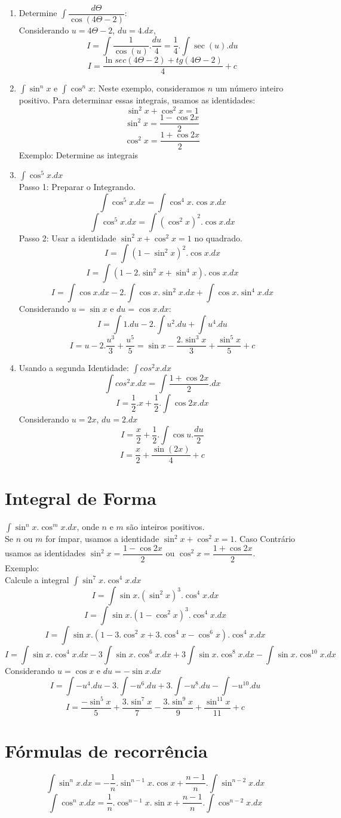 \documentclass{article}
\begin{document}
\begin{enumerate}
				\item Determine $\int \dfrac{d\Theta}{\cos{(4\Theta -2)}}$:\\
					Considerando $u = 4\Theta -2$, $du = 4.dx$,
					$$I = \int \dfrac{1}{\cos(u)}.\dfrac{du}{4}=\dfrac{1}{4}.\int \sec(u).du$$
					$$I=\dfrac{\ln sec(4\Theta-2)+tg(4\Theta -2)}{4}+c$$
				\item $\int \sin^nx$ e $\int \cos^nx$:
					Neste exemplo, consideramos $n$ um número inteiro positivo. Para determinar essas integrais, usamos as identidades:
					$$\sin^2x+\cos^2x=1$$
					$$\sin^2x=\dfrac{1-\cos{2x}}{2}$$
					$$\cos^2x = \dfrac{1+\cos{2x}}{2}$$
					Exemplo: Determine as integrais
				\item $\int \cos^5x.dx$\\
					Passo 1: Preparar o Integrando.
					$$\int \cos^5x.dx=\int \cos^4x.\cos x.dx$$
					$$\int \cos^5x.dx= \int (\cos^2x)^2.\cos x.dx$$
					Passo 2: Usar a identidade $\sin^2x+\cos^2x=1$ no quadrado.
					$$I=\int(1-\sin^2x)^2.\cos{x}.dx$$
					$$I = \int (1-2.\sin^2x+\sin^4x).\cos{x}.dx$$
					$$I=\int \cos{x}.dx - 2.\int {\cos{x}.\sin^2x.dx+\int \cos{x}.\sin^4x}.dx$$
					Considerando $u = \sin{x}$ e $du = \cos{x}.dx$:
					$$I = \int 1.du - 2.\int u^2.du +\int u^4.du$$
					$$I = u-2.\dfrac{u^3}{3}+\dfrac{u^5}{5}=\sin{x}-\dfrac{2.\sin^3x}{3}+\dfrac{\sin^5x}{5}+c$$
				\item Usando a segunda Identidade: $\int cos^2x.dx$\\
					$$\int cos^2x.dx = \int \dfrac{1+\cos{2x}}{2}.dx$$
					$$I = \dfrac{1}{2}.x +\dfrac{1}{2}.\int \cos{2x}.dx$$
					Considerando $u = 2x$, $du = 2.dx$
					$$I = \dfrac{x}{2}+\dfrac{1}{2}.\int \cos{u}.\dfrac{du}{2}$$
					$$I = \dfrac{x}{2}+\dfrac{\sin(2x)}{4}+c$$
				\end{enumerate}
	\section{Integral de Forma}
		$\int \sin^nx.\cos^mx.dx$, onde $n$ e $m$ são inteiros positivos.\\
		Se $n$ ou $m$ for ímpar, usamos a identidade $\sin^2x+\cos^2x=1$. Caso Contrário usamos as identidades $\sin^2x=\dfrac{1-\cos{2x}}{2}$ ou $\cos^2x = \dfrac{1+\cos{2x}}{2}$.\\
		Exemplo:\\
		Calcule a integral $\int \sin^7x.\cos^4x.dx$
		$$I = \int \sin{x}.(\sin^2x)^3.\cos^4x.dx$$
		$$I = \int \sin{x}.(1-\cos^2x)^3.\cos^4x.dx$$
		$$I = \int \sin{x}.(1-3.\cos^2x+3.\cos^4x-\cos^6x).\cos^4x.dx$$
		$$I= \int \sin{x}.\cos^4x.dx-3\int \sin{x}.\cos^6x.dx+3\int \sin{x}.\cos^8x.dx-\int \sin{x}.\cos^{10}x.dx$$
		Considerando $u = \cos{x}$ e $du = -\sin{x}.dx$
		$$I = \int -u^4.du -3.\int-u^6.du +3.\int -u^8.du -\int -u^{10}.du$$
		$$I=\dfrac{-\sin^5{x}}{5}+\dfrac{3.\sin^7x}{7}-\dfrac{3.\sin^9x}{9}+\dfrac{\sin^{11}x}{11}+c$$
	\section{Fórmulas de recorrência}
		$$\int \sin^nx.dx =-\dfrac{1}{n}.\sin^{n-1}x.\cos{x}+\dfrac{n-1}{n}.\int \sin^{n-2}x.dx$$
		$$\int \cos^nx.dx = \dfrac{1}{n}.\cos^{n-1}x.\sin{x}+\dfrac{n-1}{n}.\int \cos^{n-2}x.dx$$

 
\end{document}
